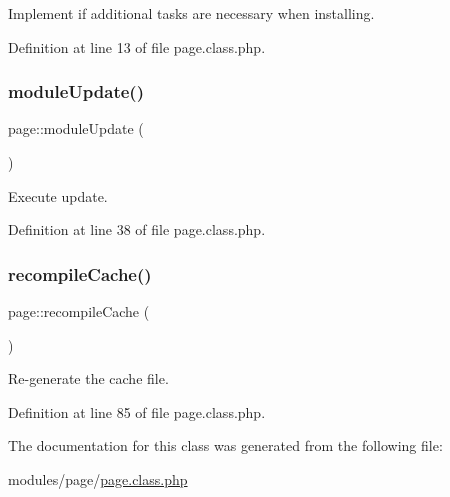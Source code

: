 Implement if additional tasks are necessary when installing. 



Definition at line 13 of file page.\+class.\+php.

\mbox{\label{classpage_a4fe60dcc5953114b95b52dd89d9ba3db}} 
\subsubsection{\texorpdfstring{module\+Update()}{moduleUpdate()}}
{\footnotesize\ttfamily page\+::module\+Update (\begin{DoxyParamCaption}{ }\end{DoxyParamCaption})}



Execute update. 



Definition at line 38 of file page.\+class.\+php.

\mbox{\label{classpage_a0943a9455bc9f6c904f29235b3234e14}} 
\subsubsection{\texorpdfstring{recompile\+Cache()}{recompileCache()}}
{\footnotesize\ttfamily page\+::recompile\+Cache (\begin{DoxyParamCaption}{ }\end{DoxyParamCaption})}



Re-\/generate the cache file. 



Definition at line 85 of file page.\+class.\+php.



The documentation for this class was generated from the following file\+:\begin{DoxyCompactItemize}
\item 
modules/page/\hyperlink{page_8class_8php}{page.\+class.\+php}\end{DoxyCompactItemize}
